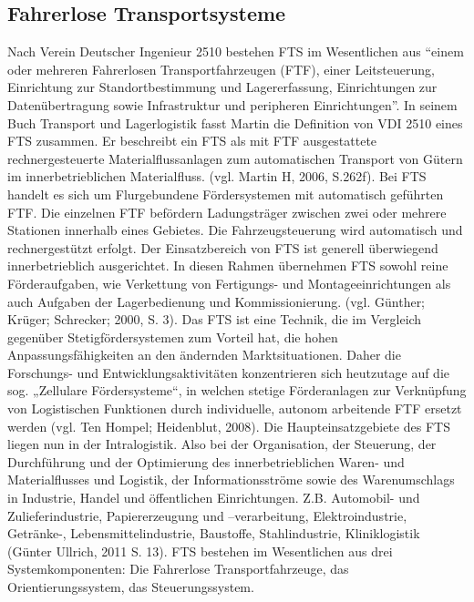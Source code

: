 \subsection{Fahrerlose Transportsysteme}
Nach Verein Deutscher Ingenieur 2510 bestehen FTS im Wesentlichen aus "`einem oder mehreren Fahrerlosen Transportfahrzeugen (FTF), einer Leitsteuerung, Einrichtung zur Standortbestimmung und Lagererfassung, Einrichtungen zur Daten\"ubertragung sowie Infrastruktur und peripheren Einrichtungen"'. In seinem Buch Transport und Lagerlogistik fasst Martin die Definition von VDI 2510 eines FTS zusammen. Er beschreibt ein FTS als mit FTF ausgestattete rechnergesteuerte Materialflussanlagen zum automatischen Transport von G\"utern im innerbetrieblichen Materialfluss. (vgl. Martin H, 2006, S.262f). Bei FTS handelt es sich um Flurgebundene F\"ordersystemen mit automatisch gef\"uhrten FTF. Die einzelnen FTF bef\"ordern Ladungstr\"ager zwischen zwei oder mehrere Stationen innerhalb eines Gebietes. Die Fahrzeugsteuerung wird automatisch und rechnergest\"utzt erfolgt. Der Einsatzbereich von FTS ist generell \"uberwiegend innerbetrieblich ausgerichtet. In diesen Rahmen \"ubernehmen FTS sowohl reine F\"orderaufgaben, wie Verkettung von Fertigungs- und Montageeinrichtungen als auch Aufgaben der Lagerbedienung und Kommissionierung. (vgl. G\"unther; Kr\"uger; Schrecker; 2000, S. 3). Das FTS ist eine Technik, die im Vergleich gegen\"uber Stetigf\"ordersystemen zum Vorteil hat, die hohen Anpassungsf\"ahigkeiten an den \"andernden Marktsituationen. Daher die Forschungs- und Entwicklungsaktivit\"aten konzentrieren sich heutzutage auf die sog. „Zellulare F\"ordersysteme“, in welchen stetige F\"orderanlagen zur Verkn\"upfung von Logistischen Funktionen durch individuelle, autonom arbeitende FTF ersetzt werden (vgl. Ten Hompel; Heidenblut, 2008). Die Haupteinsatzgebiete des FTS liegen nun in der Intralogistik. Also bei der Organisation, der Steuerung, der Durchf\"uhrung und der Optimierung des innerbetrieblichen Waren- und Materialflusses und Logistik, der Informationsstr\"ome sowie des Warenumschlags in Industrie, Handel und \"offentlichen Einrichtungen. Z.B. Automobil- und Zulieferindustrie, Papiererzeugung und –verarbeitung, Elektroindustrie, Getr\"anke-, Lebensmittelindustrie, Baustoffe, Stahlindustrie, Kliniklogistik (G\"unter Ullrich, 2011 S. 13). FTS bestehen im Wesentlichen aus drei Systemkomponenten: Die Fahrerlose Transportfahrzeuge, das Orientierungssystem, das Steuerungssystem. 
